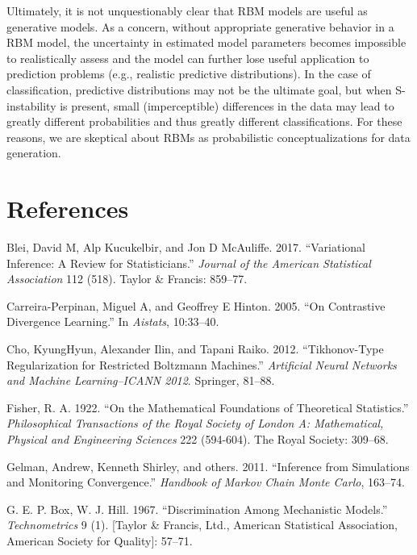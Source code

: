 \documentclass[AMS,STIX1COL]{WileyNJD-v2}
\begin{document}
Ultimately, it is not unquestionably clear that RBM models are useful as
generative models. As a concern, without appropriate generative behavior
in a RBM model, the uncertainty in estimated model parameters becomes
impossible to realistically assess and the model can further lose useful
application to prediction problems (e.g., realistic predictive
distributions). In the case of classification, predictive distributions
may not be the ultimate goal, but when S-instability is present, small
(imperceptible) differences in the data may lead to greatly different
probabilities and thus greatly different classifications. For these
reasons, we are skeptical about RBMs as probabilistic conceptualizations
for data generation.

\hypertarget{references}{%
\section*{References}\label{references}}

\hypertarget{refs}{}
\leavevmode\hypertarget{ref-blei2017variational}{}%
Blei, David M, Alp Kucukelbir, and Jon D McAuliffe. 2017. ``Variational
Inference: A Review for Statisticians.'' \emph{Journal of the American
Statistical Association} 112 (518). Taylor \& Francis: 859--77.

\leavevmode\hypertarget{ref-carreira2005contrastive}{}%
Carreira-Perpinan, Miguel A, and Geoffrey E Hinton. 2005. ``On
Contrastive Divergence Learning.'' In \emph{Aistats}, 10:33--40.

\leavevmode\hypertarget{ref-cho2012tikhonov}{}%
Cho, KyungHyun, Alexander Ilin, and Tapani Raiko. 2012. ``Tikhonov-Type
Regularization for Restricted Boltzmann Machines.'' \emph{Artificial
Neural Networks and Machine Learning--ICANN 2012}. Springer, 81--88.

\leavevmode\hypertarget{ref-fisher1922mathematical}{}%
Fisher, R. A. 1922. ``On the Mathematical Foundations of Theoretical
Statistics.'' \emph{Philosophical Transactions of the Royal Society of
London A: Mathematical, Physical and Engineering Sciences} 222
(594-604). The Royal Society: 309--68.

\leavevmode\hypertarget{ref-gelman2011inference}{}%
Gelman, Andrew, Kenneth Shirley, and others. 2011. ``Inference from
Simulations and Monitoring Convergence.'' \emph{Handbook of Markov Chain
Monte Carlo}, 163--74.

\leavevmode\hypertarget{ref-box1967discrimination}{}%
G. E. P. Box, W. J. Hill. 1967. ``Discrimination Among Mechanistic
Models.'' \emph{Technometrics} 9 (1). {[}Taylor \& Francis, Ltd.,
American Statistical Association, American Society for Quality{]}:
57--71.
\end{document}
